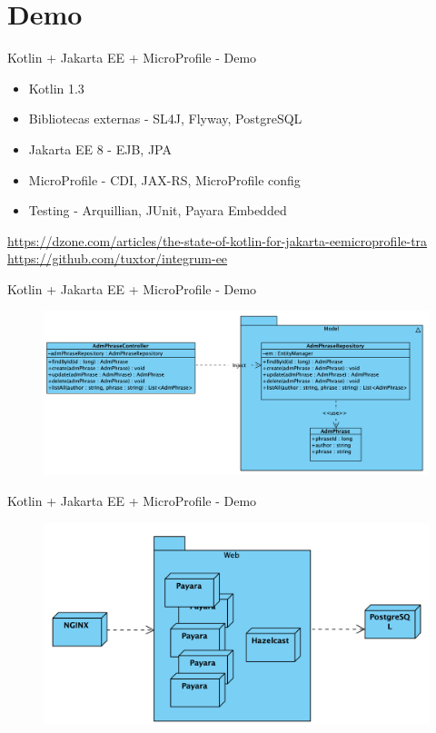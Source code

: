 \documentclass{beamer}
\begin{document}
\section{Demo}
\begin{frame}{Kotlin + Jakarta EE + MicroProfile  - Demo}

\begin{itemize}
	\item Kotlin 1.3
	\item Bibliotecas externas - SL4J, Flyway, PostgreSQL
	\item Jakarta EE 8 - EJB, JPA
	\item MicroProfile - CDI, JAX-RS, MicroProfile config
	\item Testing - Arquillian, JUnit, Payara Embedded
\end{itemize}


\normalsize  \url{https://dzone.com/articles/the-state-of-kotlin-for-jakarta-eemicroprofile-tra}\\
\normalsize  \url{https://github.com/tuxtor/integrum-ee}
\end{frame}

\begin{frame}{Kotlin + Jakarta EE + MicroProfile  - Demo}
\begin{figure}
	\centering
	\includegraphics[width=\linewidth]{Images/integrum-ee}
\end{figure}
\end{frame}

\begin{frame}{Kotlin + Jakarta EE + MicroProfile  - Demo}
\begin{figure}
	\centering
	\includegraphics[width=\linewidth]{Images/integrum-deployment}
\end{figure}
\end{frame}
\end{document}
